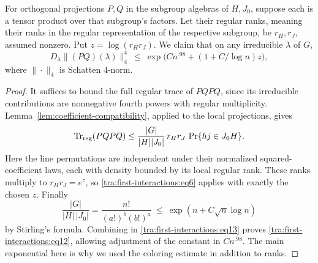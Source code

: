 \begin{lemma}\label{tra:first-interactions:crossing}

\label{tra:first-interactions:projection-fourth-moment}
For orthogonal projections \(P,Q\) in the subgroup algebras of \(H,J_0\), suppose each is a tensor product over that subgroup's factors. Let their regular ranks, meaning their ranks in the regular representation of the respective subgroup, be \(r_H,r_J\), assumed nonzero. Put \(z=\log(r_H r_J)\). We claim that on any irreducible \(\lambda\) of \(G\),
\begin{equation}
          D_\lambda \| (P Q)(\lambda) \|_4^4
                 \ \le\ \exp\big(C n^{.98}+(1+C/\log n)z\big),\label{tra:first-interactions:eq12}
\end{equation}
where \(\|\cdot\|_4\) is Schatten 4-norm.

\end{lemma}\begin{proof}

\label{tra:first-interactions:regular-coefficient-proof}
It suffices to bound the full regular trace of $PQPQ$, since its
irreducible contributions are nonnegative fourth powers with regular
multiplicity. Lemma~\ref{lem:coefficient-compatibility}, applied to
the local projections, gives
\begin{equation}
 \operatorname{Tr}_{\rm reg}(PQPQ)
 \le\frac{|G|}{|H||J_0|}\,r_Hr_J\,
       \Pr\{hj\in J_0H\}.
 \label{tra:first-interactions:eq13}
\end{equation}
Here the line permutations are independent under their normalized
squared-coefficient laws, each with density bounded by its local
regular rank. These ranks multiply to $r_Hr_J=e^z$, so
\eqref{tra:first-interactions:eq6} applies with exactly the chosen $z$.
Finally
\[
                    \frac{|G|}{|H|\,|J_0|}
                    =\frac{n!}{(a!)^b (b!)^a}
                    \ \le\ \exp(n+C\sqrt n\log n)
\]
by Stirling's formula. Combining in \eqref{tra:first-interactions:eq13} proves \eqref{tra:first-interactions:eq12}, allowing adjustment of the constant in \(C n^{.98}\). The main exponential here is why we used the coloring estimate in addition to ranks.

\end{proof}

